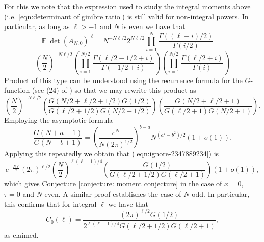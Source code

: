 \documentclass[12pt]{article}
\newcommand{\E}{\mathbb{E}}
\numberwithin{info}{section}
\numberwithin{equation}{section}
\renewcommand{\[}{\begin{equation}}
\renewcommand{\]}{\end{equation}}
\newcommand{\<}{\langle}
\renewcommand{\>}{\rangle}
\begin{document}
	For this we note that the expression used to study the integral moments above (i.e. \ref{eqn:determinant of ginibre ratio}) is still valid for non-integral powers. In particular, as long as $\ell>-1$ and $N$ is even we have that
	\[\E|\det(A_{N,0})|^\ell=N^{-N\ell/2}2^{N\ell/2}\prod_{i=1}^{N}\frac{\Gamma((\ell+i)/2)}{\Gamma(i/2)}=\]
	\[\left(\frac{N}{2}\right)^{-N\ell/2}\left(\prod_{i=1}^{N/2}\frac{\Gamma(\ell/2-1/2+i)}{\Gamma(-1/2+i)}\right)\left(\prod_{i=1}^{N/2}\frac{\Gamma(\ell/2+i)}{\Gamma(i)}\right)\label{eqn:ignore-2347889234}\]
	Product of this type can be understood using the recurrence formula for the $G$-function (see (24) of \cite{forrester-constant}) so that we may rewrite this product as
	\[\left(\frac{N}{2}\right)^{-N\ell/2}\left(\frac{G(N/2+\ell/2+1/2)G(1/2)}{G(\ell/2+1/2)G(N/2+1/2)}\right)\left(\frac{G(N/2+\ell/2+1)}{G(\ell/2+1)G(N/2+1)}\right).\]
	Employing the asymptotic formula
	\[\frac{G(N+a+1)}{G(N+b+1)}=\left(\frac{e^{N}}{N(2\pi)^{1/2}}\right)^{b-a}N^{\left(a^2-b^2\right)/2}(1+o(1)).\]
	Applying this repeatedly we obtain that (\ref{eqn:ignore-2347889234}) is
	\[e^{-\frac{N\ell}{2}}(2\pi)^{\ell/2}\left(\frac{N}{2}\right)^{\ell(\ell-1)/4}\left(\frac{G(1/2)}{G(\ell/2+1/2)G(\ell/2+1)}\right)(1+o(1)),\]
	which gives Conjecture \ref{conjecture: moment conjecture} in the case of $x=0$, $\tau=0$ and $N$ even.  A similar proof establishes the case of $N$ odd. In particular, this confirms that for integral $\ell$ we have that
	\[C_0(\ell)=\frac{(2\pi)^{\ell/2}G(1/2)}{2^{\ell(\ell-1)/4}G(\ell/2+1/2)G(\ell/2+1)},\]
	as claimed.
	
	
\end{document}
